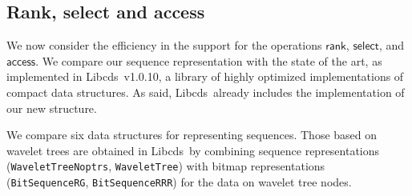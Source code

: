 \documentclass[11pt]{article}
\newcommand{\access}
    {\ensuremath{\mathsf{access}}}
\newcommand{\rank}
    {\ensuremath{\mathsf{rank}}}
\newcommand{\select}
    {\ensuremath{\mathsf{select}}}
\newcommand{\libcds}{{\sc Libcds}}
\begin{document}
\subsection{Rank, select and access}
\label{sec:exp-seqs}

We now consider the efficiency in the support for the operations \rank,
\select, and \access. We compare our sequence representation with the
state of the art, as implemented in \libcds\ v1.0.10, a library of
highly optimized implementations of compact data structures. As said,
\libcds\ already includes the implementation of our new structure.

We compare six data structures for representing sequences. Those based on 
wavelet trees are obtained in \libcds\ by combining sequence representations 
(\verb|WaveletTreeNoptrs|, \verb|WaveletTree|) with bitmap representations
(\verb|BitSequenceRG|, \verb|BitSequenceRRR|) for the data on wavelet tree 
nodes.  
\end{document}
